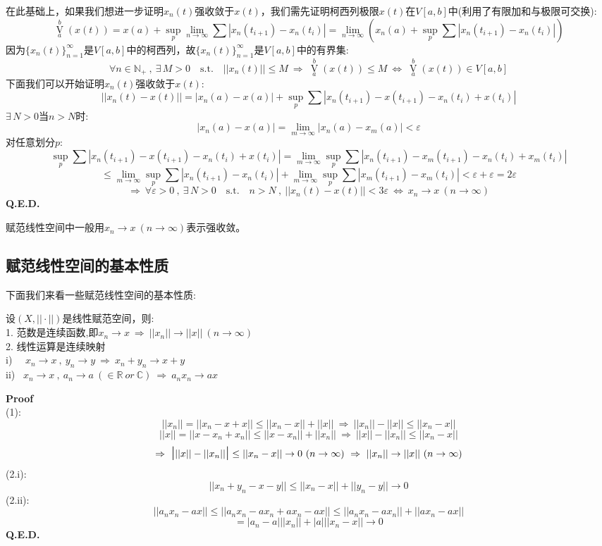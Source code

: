 在此基础上，如果我们想进一步证明$x_n(t)$强收敛于$x(t)$，我们需先证明柯西列极限$x(t)$在$V[a,b]$中(利用了有限加和与极限可交换):
\[\mathop \text{V}\limits_a^b(x(t))=x(a)+\mathop \text{sup}\limits_p \lim_{n \to \infty}\sum |x_n(t_{i+1})-x_n(t_i)|=\lim_{n \to \infty} \left ( x_n(a)+\mathop \text{sup}\limits_p \sum |x_n(t_{i+1})-x_n(t_i)| \right )\]
因为$\{x_n(t)\}_{n=1}^{\infty}$是$V[a,b]$中的柯西列，故$\{x_n(t)\}_{n=1}^{\infty}$是$V[a,b]$中的有界集:
\[\forall n \in \mathbb{N}_+ \ , \ \exists \, M>0 \quad \text{s.t.} \quad ||x_n(t)|| \leq M \ \Rightarrow \ \mathop \text{V}\limits_a^b(x(t)) \leq M \ \Leftrightarrow \ \mathop \text{V}\limits_a^b(x(t)) \in V[a,b]\]
下面我们可以开始证明$x_n(t)$强收敛于$x(t)$:
\[||x_n(t)-x(t)||=|x_n(a)-x(a)|+\mathop \text{sup}\limits_p \sum |x_n(t_{i+1})-x(t_{i+1})-x_n(t_i)+x(t_i)|\]
$\exists \, N>0$当$n>N$时:
\[|x_n(a)-x(a)|=\lim_{m \to \infty}|x_n(a)-x_m(a)|<\varepsilon\]
对任意划分$p$:
\[\mathop \text{sup}\limits_p \sum |x_n(t_{i+1})-x(t_{i+1})-x_n(t_i)+x(t_i)|=\lim_{m \to \infty}\mathop \text{sup}\limits_p \sum |x_n(t_{i+1})-x_m(t_{i+1})-x_n(t_i)+x_m(t_i)|\]
\[\leq \lim_{m \to \infty}\mathop \text{sup}\limits_p \sum |x_n(t_{i+1})-x_n(t_i)|+\lim_{m \to \infty}\mathop \text{sup}\limits_p \sum |x_m(t_{i+1})-x_m(t_i)|<\varepsilon+\varepsilon=2\varepsilon\]
\[\Rightarrow \ \forall \varepsilon>0 \ , \ \exists \, N>0 \quad \text{s.t.} \quad n>N \ , \ ||x_n(t)-x(t)||<3\varepsilon \ \Leftrightarrow \ x_n \to x \ (n \to \infty)\]
\textbf{Q.E.D.}

赋范线性空间中一般用$x_n \to x \ (n \to \infty)$表示强收敛。

\subsection{赋范线性空间的基本性质}
下面我们来看一些赋范线性空间的基本性质:
\begin{theorem}
    设$(X,||\cdot||)$是线性赋范空间，则:\\
    1. 范数是连续函数,即$x_n \to x \ \Rightarrow \ ||x_n|| \to ||x|| \ (n \to \infty)$\\
    2. 线性运算是连续映射\\
    i) \ \ $x_n \to x \ , \ y_n \to y \ \Rightarrow \ x_n+y_n \to x+y$\\
    ii) \ $x_n \to x \ , \ a_n \to a \ (\in \mathbb{R} \ or \ \mathbb{C}) \ \Rightarrow \ a_nx_n \to ax$
\end{theorem}
\textbf{Proof}\\
(1):
\[||x_n||=||x_n-x+x|| \leq ||x_n-x||+||x|| \ \Rightarrow \ ||x_n||-||x|| \leq ||x_n-x||\]
\[||x||=||x-x_n+x_n|| \leq ||x-x_n||+||x_n|| \ \Rightarrow \ ||x||-||x_n|| \leq ||x_n-x||\]
\[\Rightarrow \ \text{\Large|} ||x||-||x_n|| \text{\Large|} \leq ||x_n-x|| \to 0 \ (n \to \infty) \ \Rightarrow \ ||x_n|| \to ||x|| \ (n \to \infty)\]
(2.i):
\[||x_n+y_n-x-y|| \leq ||x_n-x||+||y_n-y|| \to 0\]
(2.ii):
\[||a_nx_n-ax|| \leq ||a_nx_n-ax_n+ax_n-ax|| \leq ||a_nx_n-ax_n||+||ax_n-ax||\]
\[=|a_n-a|||x_n||+|a|||x_n-x|| \to 0\]
\textbf{Q.E.D.}

